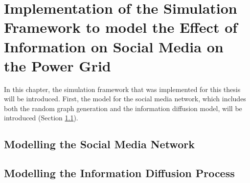 \chapter{Implementation of the Simulation Framework to model the Effect
of Information on Social Media on the Power Grid}

In this chapter, the simulation framework that was implemented for this thesis
will be introduced.
First, the model for the social media network, which includes both the 
random graph generation and the information diffusion model, will be introduced
(Section \ref{socialmediaimplementation}).

\section{Modelling the Social Media Network}
\label{socialmediaimplementation}

\section{Modelling the Information Diffusion Process}
\label{infodiffusionimplementation}



